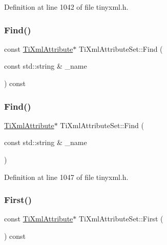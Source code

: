 Definition at line 1042 of file tinyxml.\+h.

\hypertarget{class_ti_xml_attribute_set_a49280440d5168e23b531e64afd399e50}{}\label{class_ti_xml_attribute_set_a49280440d5168e23b531e64afd399e50} 
\subsubsection{\texorpdfstring{Find()}{Find()}\hspace{0.1cm}{\footnotesize\ttfamily [3/4]}}
{\footnotesize\ttfamily const \hyperlink{class_ti_xml_attribute}{Ti\+Xml\+Attribute}$\ast$ Ti\+Xml\+Attribute\+Set\+::\+Find (\begin{DoxyParamCaption}\item[{const std\+::string \&}]{\+\_\+name }\end{DoxyParamCaption}) const}

\hypertarget{class_ti_xml_attribute_set_ab154233f8ecffc0ee0c77a045fa9e69b}{}\label{class_ti_xml_attribute_set_ab154233f8ecffc0ee0c77a045fa9e69b} 
\subsubsection{\texorpdfstring{Find()}{Find()}\hspace{0.1cm}{\footnotesize\ttfamily [4/4]}}
{\footnotesize\ttfamily \hyperlink{class_ti_xml_attribute}{Ti\+Xml\+Attribute}$\ast$ Ti\+Xml\+Attribute\+Set\+::\+Find (\begin{DoxyParamCaption}\item[{const std\+::string \&}]{\+\_\+name }\end{DoxyParamCaption})\hspace{0.3cm}{\ttfamily [inline]}}



Definition at line 1047 of file tinyxml.\+h.

\hypertarget{class_ti_xml_attribute_set_a85dfd2b5bae45c94334dced146f5c11a}{}\label{class_ti_xml_attribute_set_a85dfd2b5bae45c94334dced146f5c11a} 
\subsubsection{\texorpdfstring{First()}{First()}\hspace{0.1cm}{\footnotesize\ttfamily [1/2]}}
{\footnotesize\ttfamily const \hyperlink{class_ti_xml_attribute}{Ti\+Xml\+Attribute}$\ast$ Ti\+Xml\+Attribute\+Set\+::\+First (\begin{DoxyParamCaption}{ }\end{DoxyParamCaption}) const\hspace{0.3cm}{\ttfamily [inline]}}



